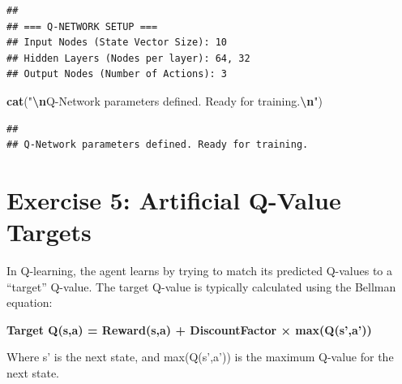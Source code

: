 \documentclass[
]{article}
\newenvironment{Shaded}{\begin{snugshade}}{\end{snugshade}}
\newcommand{\FunctionTok}[1]{\textcolor[rgb]{0.13,0.29,0.53}{\textbf{#1}}}
\newcommand{\NormalTok}[1]{#1}
\newcommand{\SpecialCharTok}[1]{\textcolor[rgb]{0.81,0.36,0.00}{\textbf{#1}}}
\newcommand{\StringTok}[1]{\textcolor[rgb]{0.31,0.60,0.02}{#1}}
\begin{document}
\begin{verbatim}
## 
## === Q-NETWORK SETUP ===
## Input Nodes (State Vector Size): 10 
## Hidden Layers (Nodes per layer): 64, 32 
## Output Nodes (Number of Actions): 3
\end{verbatim}

\begin{Shaded}
\begin{Highlighting}[]
\FunctionTok{cat}\NormalTok{(}\StringTok{"}\SpecialCharTok{\textbackslash{}n}\StringTok{Q{-}Network parameters defined. Ready for training.}\SpecialCharTok{\textbackslash{}n}\StringTok{"}\NormalTok{)}
\end{Highlighting}
\end{Shaded}

\begin{verbatim}
## 
## Q-Network parameters defined. Ready for training.
\end{verbatim}

\hypertarget{exercise-5-artificial-q-value-targets}{%
\section{Exercise 5: Artificial Q-Value
Targets}\label{exercise-5-artificial-q-value-targets}}

In Q-learning, the agent learns by trying to match its predicted
Q-values to a ``target'' Q-value. The target Q-value is typically
calculated using the Bellman equation:

\textbf{Target Q(s,a) = Reward(s,a) + DiscountFactor × max(Q(s',a'))}

Where s' is the next state, and max(Q(s',a')) is the maximum Q-value for
the next state.
\end{document}
